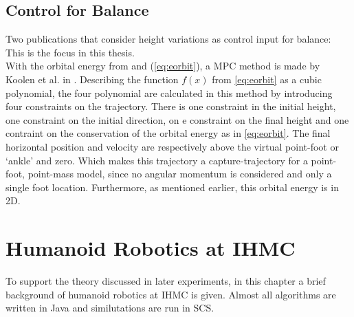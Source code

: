 \subsection{Control for Balance}\label{subsec:heightbalance}
Two publications that consider height variations as control input for balance:
\cite{koolen2016balance} \cite{caron2018capturability}
This is the focus in this thesis.\\
With the  orbital energy from \cite{pratt2007derivation} and (\eqref{eq:eorbit}), a \ac{MPC} method is made by Koolen et al. in \cite{koolen2016balance}. Describing the function $f(x)$ from \eqref{eq:eorbit} as a cubic polynomial, the four polynomial are calculated in this method by introducing four constraints on the trajectory. There is one constraint in the initial height, one constraint on the initial direction, on e constraint on the final height and one contraint on the conservation of the orbital energy as in \eqref{eq:eorbit}. The final horizontal position and velocity are respectively above the virtual point-foot or `ankle' and zero. Which makes this trajectory a capture-trajectory for a point-foot, point-mass model, since no angular momentum is considered and only a single foot location. Furthermore, as mentioned earlier, this orbital energy is in \ac{2D}.\\


\section{Humanoid Robotics at IHMC}
To support the theory discussed in later experiments, in this chapter a brief background of humanoid robotics at IHMC is given. Almost all algorithms are written in Java and similutations are run in \ac{SCS}.
